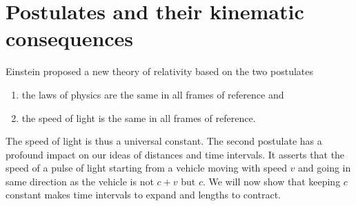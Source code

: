 \section{Postulates and their kinematic consequences}\label{c2s2}
Einstein proposed a new theory of relativity based on the two postulates
\begin{enumerate}
\item the laws of physics are the same in all frames of reference and 
\item the speed of light is the same in all frames of reference.
\end{enumerate}
The speed of light is thus a universal constant. The second postulate has a 
profound impact on our ideas of distances and time intervals. It asserts that
the speed of a pulse of light starting from a vehicle moving with speed $v$
and going in same direction as the vehicle is not $c + v$ but $c$. We will now
show that keeping $c$ constant makes time intervals to expand and lengths to 
contract.

